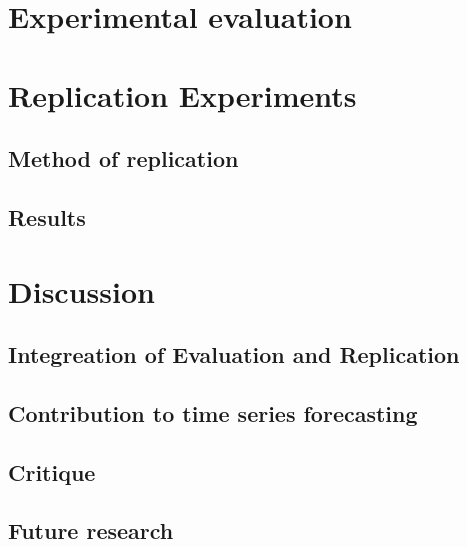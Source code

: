 \documentclass[letterpaper,twocolumn,12pt]{article}
\begin{document}
    \section{Experimental evaluation}


    \section{Replication Experiments}

    \subsection{Method of replication}

    \subsection{Results}


    \section{Discussion}

    \subsection{Integreation of Evaluation and Replication}

    \subsection{Contribution to time series forecasting}

    \subsection{Critique}
    \subsection{Future research}

    {\footnotesize 
    }


    \theendnotes
\end{document}
